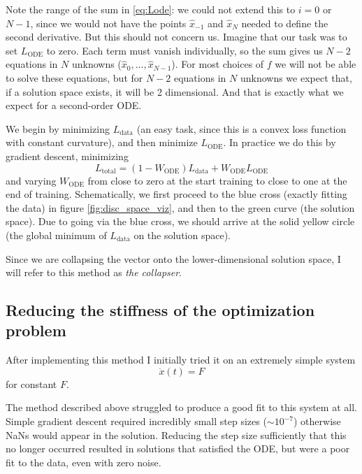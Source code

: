 \documentclass{article}
\begin{document}
Note the range of the sum in \eqref{eq:Lode}: we could not extend this to $i=0$ or $N-1$, since we would not have the points $\hat{x}_{-1}$ and $\hat{x}_N$ needed to define the second derivative.
But this should not concern us.
Imagine that our task was to set $L_{\mathrm{ODE}}$ to zero.
Each term must vanish individually, so the sum gives us $N-2$ equations in $N$ unknowns ($\hat{x}_0, \dots, \hat{x}_{N-1}$).
For most choices of $f$ we will not be able to solve these equations, but for $N-2$ equations in $N$ unknowns we expect that, if a solution space exists, it will be 2 dimensional.
And that is exactly what we expect for a second-order ODE.

We begin by minimizing $L_{\mathrm{data}}$ (an easy task, since this is a convex loss function with constant curvature), and then minimize $L_\mathrm{ODE}$.
In practice we do this by gradient descent, minimizing
$$
L_{\mathrm{total}} = (1 - W_{\mathrm{ODE}}) L_{\mathrm{data}} + W_{\mathrm{ODE}} L_{\mathrm{ODE}}
$$
and varying $W_{\mathrm{ODE}}$ from close to zero at the start training to close to one at the end of training.
Schematically, we first proceed to the blue cross (exactly fitting the data) in figure \ref{fig:disc_space_viz}, and then to the green curve (the solution space).
Due to going via the blue cross, we should arrive at the solid yellow circle (the global minimum of $L_{\mathrm{data}}$ on the solution space).

Since we are collapsing the vector onto the lower-dimensional solution space, I will refer to this method as \emph{the collapser}.

\subsection{Reducing the stiffness of the optimization problem}
\label{sec:stiffness}

After implementing this method I initially tried it on an extremely simple system
$$
\ddot{x}(t) = F
$$
for constant $F$.

The method described above struggled to produce a good fit to this system at all.
Simple gradient descent required incredibly small step sizes ($\sim 10^{-7}$) otherwise NaNs would appear in the solution.
Reducing the step size sufficiently that this no longer occurred resulted in solutions that satisfied the ODE, but were a poor fit to the data, even with zero noise.
\end{document}
